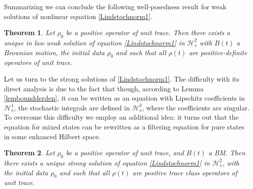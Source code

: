 \documentclass[10pt,a4paper]{amsart}
\def\HC{\mathcal{H}}
\newtheorem{theorem}{Theorem}[section]
\begin{document}
Summarizing we can conclude the following well-posedness
result for weak solutions of nonlinear equation \eqref{Lindstochnorm1}.

\begin{theorem}
\label{LindStochnonLin}
Let $\rho_0$ be a positive operator of unit trace.
Then there exists a unique in law weak solution of equation \eqref{Lindstochnorm1} in $\HC^2_s$
with $B(t)$ a Brownian motion, the initial data $\rho_0$ and such that all $\rho(t)$
are positive-definite operators of unit trace.
\end{theorem}

Let us turn to the strong solutions of \eqref{Lindstochnorm1}. The difficulty with its direct analysis
is due to the fact that though, according to Lemma \ref{lemboundderden}, it can be written
as an equation with Lipschitz coefficients in $\HC^1_s$, the stochastic integrals are defined in $\HC^2_s$,
where the coefficients are singular.
To overcome this difficulty we employ an additional idea:
it turns out that the equation for mixed states can be rewritten as a filtering equation for pure
 states in some enhanced Hilbert space.

 \begin{theorem}
\label{LindStochnonLin1}
Let $\rho_0$ be a positive operator of unit trace,
and $B(t)$ a BM. Then there exists a unique strong solution of equation
\eqref{Lindstochnorm1} in $\HC^2_s$, with the initial data $\rho_0$
and such that all $\rho(t)$ are positive trace class operators of unit trace.
\end{theorem}
\end{document}
